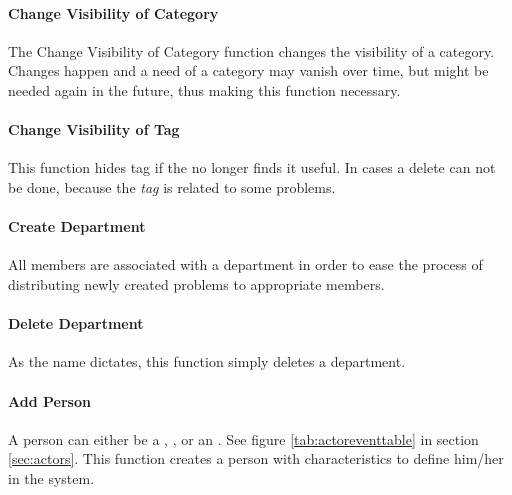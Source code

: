 \paragraph{Change Visibility of Category} The Change Visibility of Category function changes the visibility of a category. Changes happen and a need of a category may vanish over time, but might be needed again in the future, thus making this function necessary. 

\paragraph{Change Visibility of Tag} This function hides tag if the \sadmin{} no longer finds it useful. In cases a delete can not be done, because the \textit{tag} is related to some problems. 




\paragraph{Create Department} All \astaff[] members are associated with a department in order to ease the process of distributing newly created problems to appropriate \astaff[] members. 

\paragraph{Delete Department} As the name dictates, this function simply deletes a department. 

\paragraph{Add Person} A person can either be a \aclient[], \astaff[], or an \admin[]. See figure \ref{tab:actoreventtable} in section \ref{sec:actors}. This function creates a person with characteristics to define him/her in the system.

